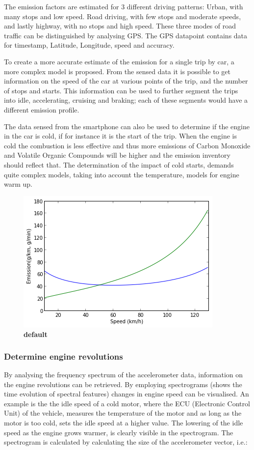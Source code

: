 The emission factors are estimated for 3 different driving patterns: Urban, with many stops and low speed. Road driving, with few stops and moderate speeds, and lastly highway, with no stops and high speed. These three modes of road traffic can be distinguished by analysing GPS. The GPS datapoint contains data for timestamp, Latitude, Longitude, speed and accuracy. 

To create a more accurate estimate of the emission for a single trip by car, a more complex model is proposed. From the sensed data it is possible to get information on the speed of the car at various points of the trip, and the number of stops and starts. This information can be used to further segment the trips into idle, accelerating, cruising and braking; each of these segments would have a different emission profile. 

The data sensed from the smartphone can also be used to determine if the engine in the car is cold, if for instance it is the start of the trip. When the engine is cold the combustion is less effective and thus more emissions of Carbon Monoxide and Volatile Organic Compounds will be higher and the emission inventory should reflect that. The determination of the impact of cold starts, demands quite complex models, taking into account the temperature, models for engine warm up. 
\begin{figure}[htbp]
\begin{center}
\includegraphics{emission_vs_speed.png}
\caption{{\bf default}}
\label{emission_vs_speed}
\end{center}
\end{figure}


\subsubsection{Determine engine revolutions}
By analysing the frequency spectrum of the accelerometer data, information on the engine revolutions can be retrieved. By employing spectrograms (shows the time evolution of spectral features)  changes in engine speed can be visualised. An example is the the idle speed of a cold motor, where the ECU (Electronic Control Unit) of the vehicle, measures the temperature of the motor and as long as the motor is too cold, sets the idle speed at a higher value. The lowering of the idle speed as the engine grows warmer, is clearly visible in the spectrogram.
The spectrogram is calculated by calculating the size of the accelerometer vector, i.e.:

